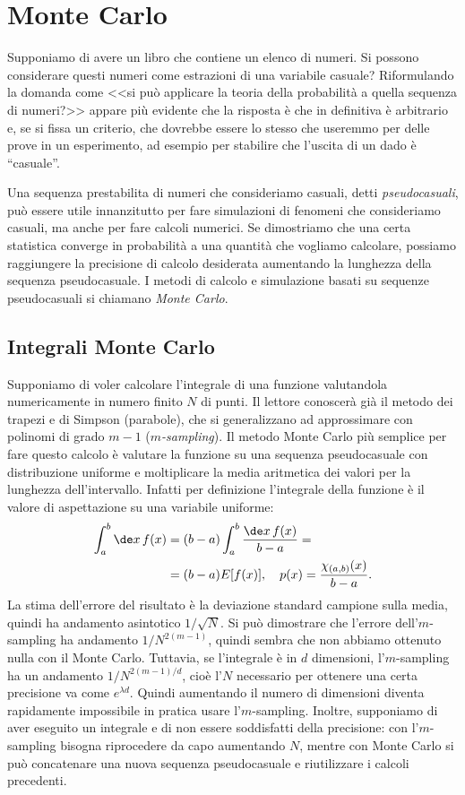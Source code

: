 
\section{Monte Carlo}

Supponiamo di avere un libro che contiene un elenco di numeri.
Si possono considerare questi numeri come estrazioni di una variabile casuale?
Riformulando la domanda come
<<si può applicare la teoria della probabilità a quella sequenza di numeri?>>
appare più evidente che la risposta è che in definitiva è arbitrario e,
se si fissa un criterio,
che dovrebbe essere lo stesso che useremmo per delle prove in un esperimento,
ad esempio per stabilire che l'uscita di un dado è ``casuale''.

Una sequenza prestabilita di numeri che consideriamo casuali,
detti \emph{pseudocasuali},
può essere utile innanzitutto per fare simulazioni di fenomeni che consideriamo casuali,
ma anche per fare calcoli numerici.
Se dimostriamo che una certa statistica converge in probabilità a una quantità che vogliamo calcolare,
possiamo raggiungere la precisione di calcolo desiderata aumentando la lunghezza della sequenza pseudocasuale.
I metodi di calcolo e simulazione basati su sequenze pseudocasuali si chiamano \emph{Monte Carlo}.

\subsection{Integrali Monte Carlo}

Supponiamo di voler calcolare l'integrale di una funzione valutandola numericamente in numero finito $N$ di punti.
Il lettore conoscerà già il metodo dei trapezi e di Simpson (parabole),
che si generalizzano ad approssimare con polinomi di grado $m-1$ (\emph{$m$-sampling}).
Il metodo Monte Carlo più semplice per fare questo calcolo
è valutare la funzione su una sequenza pseudocasuale con distribuzione uniforme
e moltiplicare la media aritmetica dei valori per la lunghezza dell'intervallo.
Infatti per definizione l'integrale della funzione è il valore di aspettazione su una variabile uniforme:
\begin{align*}
	\int_a^b \de x\,f(x)
	&= (b-a)\int_a^b \frac{\de x\,f(x)}{b-a} = \\
	&= (b-a) E[f(x)], \quad p(x) = \frac{\chi_{(a,b)}(x)}{b-a}.
\end{align*}
La stima dell'errore del risultato è la deviazione standard campione sulla media,
quindi ha andamento asintotico $1/\sqrt N$.
Si può dimostrare che l'errore dell'$m$-sampling ha andamento $1/N^{2(m-1)}$,
quindi sembra che non abbiamo ottenuto nulla con il Monte Carlo.
Tuttavia, se l'integrale è in $d$ dimensioni, l'$m$-sampling ha un andamento $1/N^{2(m-1)/d}$,
cioè l'$N$ necessario per ottenere una certa precisione va come $e^{\lambda d}$.
Quindi aumentando il numero di dimensioni diventa rapidamente impossibile in pratica usare l'$m$-sampling.
Inoltre, supponiamo di aver eseguito un integrale e di non essere soddisfatti della precisione:
con l'$m$-sampling bisogna riprocedere da capo aumentando $N$,
mentre con Monte Carlo si può concatenare una nuova sequenza pseudocasuale e riutilizzare i calcoli precedenti.

